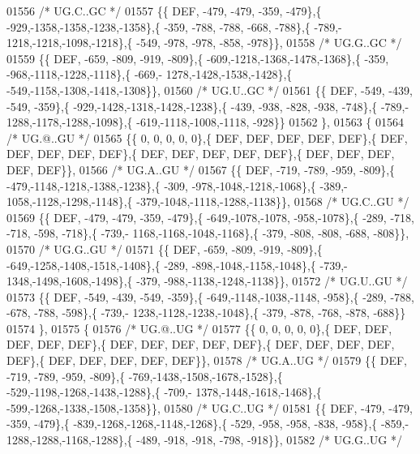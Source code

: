 \begin{DoxyCode}
01556 \textcolor{comment}{/* UG.C..GC */}
01557 \{\{  DEF, -479, -479, -359, -479\},\{ -929,-1358,-1358,-1238,-1358\},\{ -359, -788, -788, -668, -788\},\{ -789,-
      1218,-1218,-1098,-1218\},\{ -549, -978, -978, -858, -978\}\},
01558 \textcolor{comment}{/* UG.G..GC */}
01559 \{\{  DEF, -659, -809, -919, -809\},\{ -609,-1218,-1368,-1478,-1368\},\{ -359, -968,-1118,-1228,-1118\},\{ -669,-
      1278,-1428,-1538,-1428\},\{ -549,-1158,-1308,-1418,-1308\}\},
01560 \textcolor{comment}{/* UG.U..GC */}
01561 \{\{  DEF, -549, -439, -549, -359\},\{ -929,-1428,-1318,-1428,-1238\},\{ -439, -938, -828, -938, -748\},\{ -789,-
      1288,-1178,-1288,-1098\},\{ -619,-1118,-1008,-1118, -928\}\}
01562 \},
01563 \{
01564 \textcolor{comment}{/* UG.@..GU */}
01565 \{\{    0,    0,    0,    0,    0\},\{  DEF,  DEF,  DEF,  DEF,  DEF\},\{  DEF,  DEF,  DEF,  DEF,  DEF\},\{  DEF,  
      DEF,  DEF,  DEF,  DEF\},\{  DEF,  DEF,  DEF,  DEF,  DEF\}\},
01566 \textcolor{comment}{/* UG.A..GU */}
01567 \{\{  DEF, -719, -789, -959, -809\},\{ -479,-1148,-1218,-1388,-1238\},\{ -309, -978,-1048,-1218,-1068\},\{ -389,-
      1058,-1128,-1298,-1148\},\{ -379,-1048,-1118,-1288,-1138\}\},
01568 \textcolor{comment}{/* UG.C..GU */}
01569 \{\{  DEF, -479, -479, -359, -479\},\{ -649,-1078,-1078, -958,-1078\},\{ -289, -718, -718, -598, -718\},\{ -739,-
      1168,-1168,-1048,-1168\},\{ -379, -808, -808, -688, -808\}\},
01570 \textcolor{comment}{/* UG.G..GU */}
01571 \{\{  DEF, -659, -809, -919, -809\},\{ -649,-1258,-1408,-1518,-1408\},\{ -289, -898,-1048,-1158,-1048\},\{ -739,-
      1348,-1498,-1608,-1498\},\{ -379, -988,-1138,-1248,-1138\}\},
01572 \textcolor{comment}{/* UG.U..GU */}
01573 \{\{  DEF, -549, -439, -549, -359\},\{ -649,-1148,-1038,-1148, -958\},\{ -289, -788, -678, -788, -598\},\{ -739,-
      1238,-1128,-1238,-1048\},\{ -379, -878, -768, -878, -688\}\}
01574 \},
01575 \{
01576 \textcolor{comment}{/* UG.@..UG */}
01577 \{\{    0,    0,    0,    0,    0\},\{  DEF,  DEF,  DEF,  DEF,  DEF\},\{  DEF,  DEF,  DEF,  DEF,  DEF\},\{  DEF,  
      DEF,  DEF,  DEF,  DEF\},\{  DEF,  DEF,  DEF,  DEF,  DEF\}\},
01578 \textcolor{comment}{/* UG.A..UG */}
01579 \{\{  DEF, -719, -789, -959, -809\},\{ -769,-1438,-1508,-1678,-1528\},\{ -529,-1198,-1268,-1438,-1288\},\{ -709,-
      1378,-1448,-1618,-1468\},\{ -599,-1268,-1338,-1508,-1358\}\},
01580 \textcolor{comment}{/* UG.C..UG */}
01581 \{\{  DEF, -479, -479, -359, -479\},\{ -839,-1268,-1268,-1148,-1268\},\{ -529, -958, -958, -838, -958\},\{ -859,-
      1288,-1288,-1168,-1288\},\{ -489, -918, -918, -798, -918\}\},
01582 \textcolor{comment}{/* UG.G..UG */}

\end{DoxyCode}
